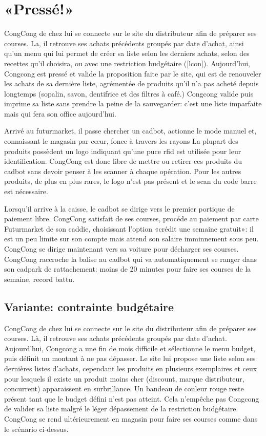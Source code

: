 \section{«Pressé!»}

CongCong de chez lui se connecte sur le site du distributeur afin de préparer ses courses.
La, il retrouve ses achats précédents groupés par date d'achat, ainsi qu'un menu qui lui permet de créer sa liste selon les derniers achats, selon des recettes qu'il choisira, ou avec une restriction budgétaire ([lcon]). 
Aujourd'hui, Congcong est pressé et valide la proposition faite par le site, qui est de renouveler les achats de sa dernière liste, agrémentée de produits qu'il n'a pas acheté depuis longtemps (sopalin, savon, dentifrice et des filtres à café.)
Congcong valide puis imprime sa liste sans prendre la peine de la sauvegarder: c'est une liste imparfaite mais qui fera son office aujourd'hui.
\par
Arrivé au futurmarket, il passe chercher un cadbot, actionne le mode manuel et, connaissant le magasin par cœur, fonce à travers les rayons 
La plupart des produits possèdent un logo indiquant qu'une puce rfid est utilisée pour leur identification.
CongCong est donc libre de mettre ou retirer ces produits du cadbot sans devoir penser à les scanner à chaque opération.
Pour les autres produits, de plus en plus rares, le logo n'est pas présent et le scan du code barre est nécessaire.
\par
Lorsqu'il arrive à la caisse, le cadbot se dirige vers le premier portique de paiement libre.
CongCong satisfait de ses courses, procéde au paiement par carte Futurmarket de son caddie, choisissant l'option «crédit une semaine gratuit»: il est un peu limite sur son compte mais attend son salaire imminnement sous peu.
CongCong se dirige maintenant vers sa voiture pour décharger ses courses.
CongCong raccroche la balise au cadbot qui va automatiquement se ranger dans son cadpark de rattachement: moins de 20 minutes pour faire ses courses de la semaine, record battu.

\subsection{Variante: contrainte budgétaire}
CongCong de chez lui se connecte sur le site du distributeur afin de préparer ses courses.
Là, il retrouve ses achats précédents groupés par date d'achat.
Aujourd'hui, Congcong a une fin de mois difficile et sélectionne le menu budget, puis définit un montant à ne pas dépasser.
Le site lui propose une liste selon ses dernières listes d'achats, cependant les produits en plusieurs exemplaires et ceux pour lesquels il existe un produit moins cher (discount, marque distributeur, concurrent) apparaissent en surbrillance. 
Un bandeau de couleur rouge reste présent tant que le budget défini n'est pas atteint.
Cela n'empêche pas Congcong de valider sa liste malgré le léger dépassement de la restriction budgétaire.
CongCong se rend ultérieurement en magasin pour faire ses courses comme dans le scénario ci-dessus.

